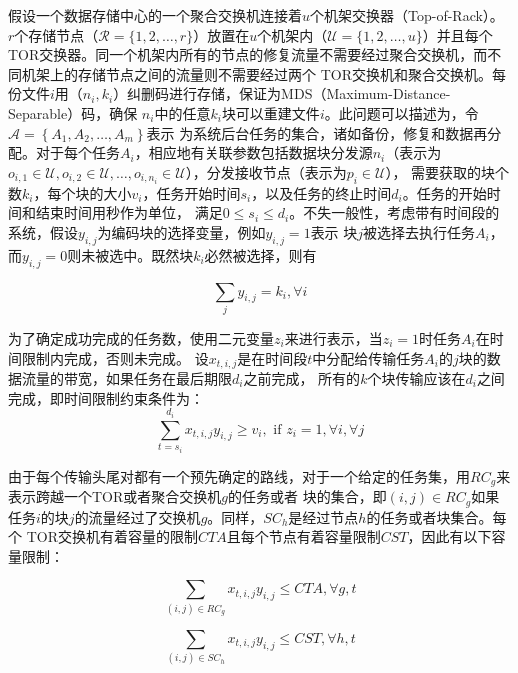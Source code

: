 假设一个数据存储中心的一个聚合交换机连接着$u$个机架交换器（Top-of-Rack）。
$r$个存储节点（$\mathcal{R}=\{1,2, \ldots, r\}$）放置在$u$个机架内（$\mathcal{U}=\{1,2, \ldots, u\}$）并且每个
TOR交换器。同一个机架内所有的节点的修复流量不需要经过聚合交换机，而不同机架上的存储节点之间的流量则不需要经过两个
TOR交换机和聚合交换机。每份文件$i$用（$n_i, k_i$）纠删码进行存储，保证为MDS（Maximum-Distance-Separable）码，确保
$n_i$中的任意$k_i$块可以重建文件$i$。此问题可以描述为，令$\mathcal{A}=\left\{A_{1}, A_{2}, \ldots, A_{m}\right\}$表示
为系统后台任务的集合，诸如备份，修复和数据再分配。对于每个任务$A_i$，相应地有关联参数包括数据块分发源$n_i$（表示为
$o_{i, 1} \in \mathcal{U}, o_{i, 2} \in \mathcal{U}, \ldots, o_{i, n_{i}} \in \mathcal{U}$），分发接收节点（表示为$p_{i} \in \mathcal{U}$），
需要获取的块个数$k_i$，每个块的大小$v_i$，任务开始时间$s_i$，以及任务的终止时间$d_i$。任务的开始时间和结束时间用秒作为单位，
满足$0 \leq s_{i} \leq d_{i}$。不失一般性，考虑带有时间段的系统，假设$y_{i, j}$为编码块的选择变量，例如$y_{i, j}=1$表示
块$j$被选择去执行任务$A_i$，而$y_{i, j}=0$则未被选中。既然块$k_i$必然被选择，则有

\begin{equation}
	\label{eq:2-1}
	\sum_{j} y_{i, j}=k_{i}, \forall i
\end{equation}

为了确定成功完成的任务数，使用二元变量$z_i$来进行表示，当$z_i=1$时任务$A_i$在时间限制内完成，否则未完成。
设$x_{t, i, j}$是在时间段$t$中分配给传输任务$A_i$的$j$块的数据流量的带宽，如果任务在最后期限$d_i$之前完成，
所有的$k$个块传输应该在$d_i$之间完成，即时间限制约束条件为：
\begin{equation}
	\label{eq:2-2}
	\sum_{t=s_{i}}^{d_{i}} x_{t, i, j} y_{i, j} \geq v_{i}, \text { if } z_{i}=1, \forall i, \forall j
\end{equation}

由于每个传输头尾对都有一个预先确定的路线，对于一个给定的任务集，用$RC_g$来表示跨越一个TOR或者聚合交换机$g$的任务或者
块的集合，即$(i,j)\in RC_g$如果任务$i$的块$j$的流量经过了交换机$g$。同样，$SC_h$是经过节点$h$的任务或者块集合。每个
TOR交换机有着容量的限制$CTA$且每个节点有着容量限制$CST$，因此有以下容量限制：

\begin{equation}
	\label{eq:2-3}
	\sum_{(i, j) \in R C_{g}} x_{t, i, j} y_{i, j} \leq C T A, \forall g, t
\end{equation}


\begin{equation}
	\label{eq:2-4}
	\sum_{(i, j) \in S C_{h}} x_{t, i, j} y_{i, j} \leq C S T, \forall h, t
\end{equation}


